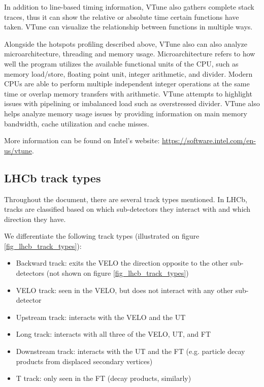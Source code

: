 \documentclass[12pt]{article}
\begin{document}
In addition to line-based timing information, VTune also gathers complete stack traces, thus it can show the relative or absolute time certain functions have taken. VTune can visualize the relationship between functions in multiple ways.
\vspace{1pc}

Alongside the hotspots profiling described above, VTune also can also analyze microarchitecture, threading and memory usage. Microarchitecture refers to how well the program utilizes the available functional units of the CPU, such as memory load/store, floating point unit, integer arithmetic, and divider. Modern CPUs are able to perform multiple independent integer operations at the same time or overlap memory transfers with arithmetic. VTune attempts to highlight issues with pipelining or imbalanced load such as overstressed divider. VTune also helps analyze memory usage issues by providing information on main memory bandwidth, cache utilization and cache misses.
\vspace{1pc}

More information can be found on Intel's website: \url{https://software.intel.com/en-us/vtune}.

\subsection{LHCb track types}

Throughout the document, there are several track types mentioned. In LHCb, tracks are classified based on which sub-detectors they interact with and which direction they have.
\vspace{1pc}

\noindent We differentiate the following track types (illustrated on figure \ref{fig_lhcb_track_types}):
\begin{itemize}
	\item Backward track: exits the VELO the direction opposite to the other sub-detectors (not shown on figure \ref{fig_lhcb_track_types})
	\item VELO track: seen in the VELO, but does not interact with any other sub-detector
	\item Upstream track: interacts with the VELO and the UT
	\item Long track: interacts with all three of the VELO, UT, and FT
	\item Downstream track: interacts with the UT and the FT (e.g. particle decay products from displaced secondary vertices)
	\item T track: only seen in the FT (decay products, similarly)
\end{itemize}
\end{document}
